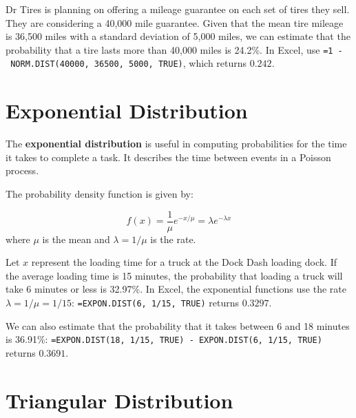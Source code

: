 \documentclass[
  11pt,
  letterpaper,
  DIV=11,
  numbers=noendperiod,
  oneside,
  open=any]{scrreprt}
\begin{document}
\begin{bsexample}[Example]

Dr Tires is planning on offering a mileage guarantee on each set of
tires they sell. They are considering a 40,000 mile guarantee. Given
that the mean tire mileage is 36,500 miles with a standard deviation of
5,000 miles, we can estimate that the probability that a tire lasts more
than 40,000 miles is 24.2\%. In Excel, use
\texttt{=1\ -\ NORM.DIST(40000,\ 36500,\ 5000,\ TRUE)}, which returns
\(0.242\).

\end{bsexample}

\section{Exponential Distribution}\label{exponential-distribution}

The \textbf{exponential distribution} is useful in computing
probabilities for the time it takes to complete a task. It describes the
time between events in a Poisson process.

The probability density function is given by:

\begin{bsformula}

\[f(x)=\frac{1}{\mu} e^{-x/\mu}=\lambda e^{-\lambda x}\] where \(\mu\)
is the mean and \(\lambda = 1/\mu\) is the rate.

\end{bsformula}

\begin{bsexample}[Example]

Let \(x\) represent the loading time for a truck at the Dock Dash
loading dock. If the average loading time is 15 minutes, the probability
that loading a truck will take 6 minutes or less is 32.97\%. In Excel,
the exponential functions use the rate \(\lambda = 1/\mu = 1/15\):
\texttt{=EXPON.DIST(6,\ 1/15,\ TRUE)} returns \(0.3297\).

We can also estimate that the probability that it takes between 6 and 18
minutes is 36.91\%:
\texttt{=EXPON.DIST(18,\ 1/15,\ TRUE)\ -\ EXPON.DIST(6,\ 1/15,\ TRUE)}
returns \(0.3691\).

\end{bsexample}

\section{Triangular Distribution}\label{triangular-distribution}
\end{document}

